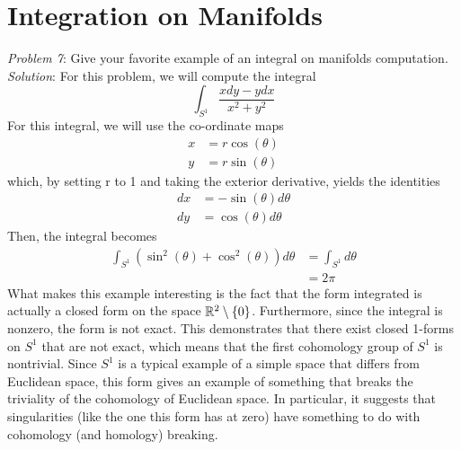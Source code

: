 \section{Integration on Manifolds}

\emph{Problem 7}: Give your favorite example of an integral on manifolds
computation.
\\

\emph{Solution}: For this problem, we will compute the integral
\[
\int_{S^1}\frac{xdy -ydx}{x^2+y^2}
\]
For this integral, we will use the co-ordinate maps
\[
\begin{aligned}
x &= r\cos(\theta)\\
y &= r\sin(\theta)
\end{aligned}
\]
which, by setting r to 1 and taking the exterior derivative, yields the
identities
\[
\begin{aligned}
dx &= -\sin(\theta)d\theta\\
dy &=  \cos(\theta)d\theta
\end{aligned}
\]
Then, the integral becomes
\[
\begin{aligned}
\int_{S^1} (\sin^2(\theta) + \cos^2(\theta))d\theta &= \int_{S^1} d\theta\\
                                             &= 2\pi
\end{aligned}
\]
What makes this example interesting is the fact that the form integrated is
actually a closed form on the space $\mathbb{R}^2\setminus\{0\}$. Furthermore, since the
integral is nonzero, the form is not exact. This demonstrates that there exist
closed 1-forms on $S^1$ that are not exact, which means that the first
cohomology group of $S^1$ is nontrivial. Since $S^1$ is a typical example of a
simple space that differs from Euclidean space, this form gives an example of
something that breaks the triviality of the cohomology of Euclidean space. In
particular, it suggests that singularities (like the one this form has at zero)
have something to do with cohomology (and homology) breaking. 
